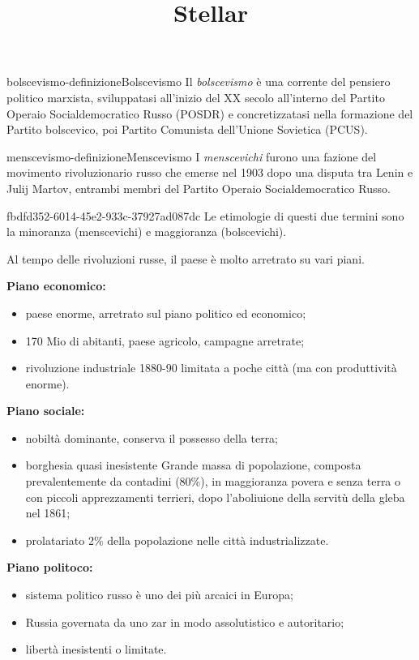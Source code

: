 \documentclass[preview]{standalone}
\begin{document}
\title{Stellar}
\genpage

\begin{snippetdefinition}{bolscevismo-definizione}{Bolscevismo}
    Il \textit{bolscevismo} è una corrente del pensiero
    politico marxista, sviluppatasi all'inizio del XX secolo all'interno
    del Partito Operaio Socialdemocratico Russo (POSDR) e
    concretizzatasi nella formazione del Partito bolscevico,
    poi Partito Comunista dell'Unione Sovietica (PCUS).
\end{snippetdefinition}

\begin{snippetdefinition}{menscevismo-definizione}{Menscevismo}
    I \textit{menscevichi} furono una fazione del movimento rivoluzionario
    russo che emerse nel 1903 dopo una disputa tra Lenin e Julij Martov,
    entrambi membri del Partito Operaio Socialdemocratico Russo.
\end{snippetdefinition}

\begin{snippet}{fbdfd352-6014-45e2-933c-37927ad087dc}
    Le etimologie di questi due termini sono la minoranza (menscevichi)
    e maggioranza (bolscevichi).
    
    Al tempo delle rivoluzioni russe, il paese è molto arretrato su vari piani.
    
    \textbf{Piano economico:}
    \begin{itemize}
        \item paese enorme, arretrato sul piano politico ed economico;
        \item 170 Mio di abitanti, paese agricolo, campagne arretrate;
        \item rivoluzione industriale 1880-90 limitata a poche città (ma con produttività enorme). 
    \end{itemize}
    
    \textbf{Piano sociale:}
    \begin{itemize}
        \item nobiltà dominante, conserva il possesso della terra;
        \item borghesia quasi inesistente
        Grande massa di popolazione, composta prevalentemente da contadini (80\%),
        in maggioranza povera e senza terra o con piccoli apprezzamenti terrieri, dopo l'aboliuione della servitù
        della gleba nel 1861;
        \item prolatariato 2\% della popolazione nelle città industrializzate.
    \end{itemize}
    
    \textbf{Piano politoco:}
    \begin{itemize}
        \item sistema politico russo è uno dei più arcaici in Europa;
        \item Russia governata da uno zar in modo assolutistico e autoritario;
        \item libertà inesistenti o limitate.
    \end{itemize}
\end{snippet}
\end{document}

